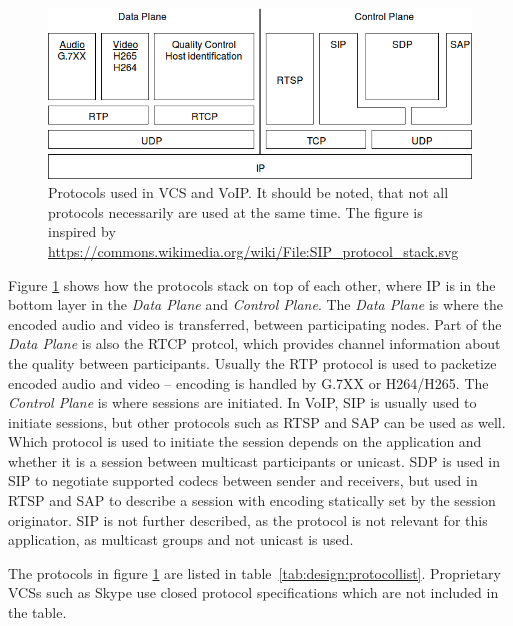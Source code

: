 \begin{figure}[H]
	\centering
	\includegraphics[width=\textwidth]{figures/protocol_stack}
	\caption{Protocols used in VCS and VoIP. It should be noted, that not all protocols necessarily are used at the same time. The figure is inspired by \url{https://commons.wikimedia.org/wiki/File:SIP_protocol_stack.svg}}
	\label{fig:design:protocolstack}
\end{figure} 

Figure \ref{fig:design:protocolstack} shows how the protocols stack on top of each other, where \ac{IP} is in the bottom layer in the \textit{Data Plane} and \textit{Control Plane}. The  \textit{Data Plane} is where the encoded audio and video is transferred, between participating nodes. Part of the \textit{Data Plane} is also the RTCP protcol, which provides channel information about the quality between participants. Usually the RTP protocol is used to packetize encoded audio and video -- encoding is handled by G.7XX or H264/H265. The \textit{Control Plane} is where sessions are initiated. In VoIP, \ac{SIP} is usually used to initiate sessions, but other protocols such as RTSP and SAP can be used as well. Which protocol is used to initiate the session depends on the application and whether it is a session between multicast participants or unicast. SDP is used in \ac{SIP} to negotiate supported codecs between sender and receivers, but used in RTSP and SAP to describe a session with encoding statically set by the session originator\citep{voip_fundamentals}.  \ac{SIP} is not further described, as the protocol is not relevant for this application, as multicast groups and not unicast is used. 

The protocols in figure \ref{fig:design:protocolstack} are listed in table~\ref{tab:design:protocollist}. Proprietary VCSs such as Skype use closed protocol specifications which are not included in the table.


